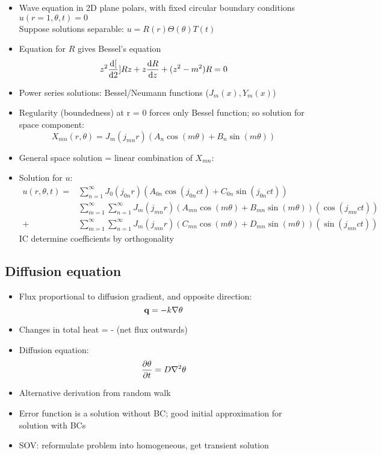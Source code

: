 \begin{itemize}
    \item Wave equation in 2D plane polars, with fixed circular boundary conditions $u(r=1,\theta,t) = 0$\\
          Suppose solutions separable: $u = R(r) \Theta(\theta) T(t)$

    \item Equation for $R$ gives Bessel's equation \[z^2 \frac{\mathrm{d}{[}}{\mathrm{d}{2}}]{R}{z} + z \frac{\mathrm{d}{R}}{\mathrm{d}{z}} +(z^2-m^2)R = 0\]

    \item Power series solutions: Bessel/Neumann functions ($J_m(x), Y_m(x)$)

    \item Regularity (boundedness) at r = 0 forces only Bessel function; so solution for space component: \[X_{mn}(r,\theta) = J_m(j_{mn} r) (A_n \cos(m\theta) + B_n \sin(m\theta))\]

    \item General space solution = linear combination of $X_{mn}$:
    \item Solution for $u$: \begin{align*}
              u(r,\theta,t) = & \sum_{n=1}^{\infty} J_0(j_{0n} r) \left( A_{0n} \cos (j_{0n} ct) +  C_{0n} \sin (j_{0n} ct)  \right)                                \\
                              & \sum_{m=1}^{\infty} \sum_{n=1}^{\infty} J_m(j_{mn} r) (A_{mn} \cos(m\theta) + B_{mn} \sin(m\theta)) \left( \cos (j_{mn} ct) \right) \\
              +               & \sum_{m=1}^{\infty} \sum_{n=1}^{\infty} J_m(j_{mn} r) (C_{mn} \cos(m\theta) + D_{mn} \sin(m\theta)) \left( \sin (j_{mn} ct) \right)
          \end{align*}
          IC determine coefficients by orthogonality

\end{itemize}

\subsection*{Diffusion equation}
\begin{itemize}
    \item Flux proportional to diffusion gradient, and opposite direction: \[\boldsymbol{\mathbf{q}} = -k \mathbf{\nabla} \theta\]
    \item Changes in total heat = - (net flux outwards)
    \item Diffusion equation: \[\frac{\partial{\theta}}{\partial{t}} = D \mathbf{\nabla} ^2 \theta\]
    \item Alternative derivation from random walk
    \item Error function is a solution without BC; good initial approximation for solution with BCs
    \item SOV: reformulate problem into homogeneous, get transient solution


\end{itemize}

